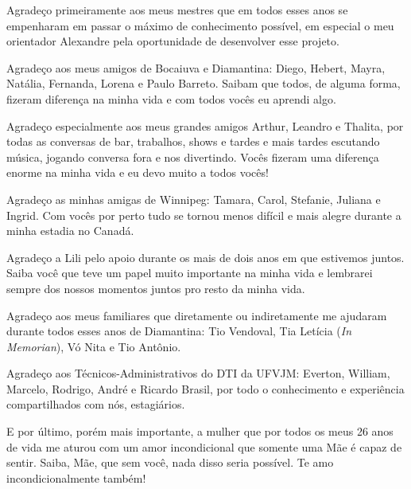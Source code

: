 \begin{agradecimentos}

Agradeço primeiramente aos meus mestres que em todos esses anos se empenharam 
em passar o máximo de conhecimento possível, em especial o meu orientador 
Alexandre pela oportunidade de desenvolver esse projeto.

Agradeço aos meus amigos de Bocaiuva e Diamantina: Diego, Hebert, Mayra, 
Natália, Fernanda, Lorena e Paulo Barreto. Saibam que todos, de alguma forma, 
fizeram diferença na minha vida e com todos vocês eu aprendi algo.

Agradeço especialmente aos meus grandes amigos Arthur, Leandro e Thalita, por 
todas as conversas de bar, trabalhos, shows e tardes e mais tardes escutando 
música, jogando conversa fora e nos divertindo. Vocês fizeram uma diferença 
enorme na minha vida e eu devo muito a todos vocês!

Agradeço as minhas amigas de Winnipeg: Tamara, Carol, Stefanie, Juliana e 
Ingrid. Com vocês por perto tudo se tornou menos difícil e mais alegre durante 
a minha estadia no Canadá.

Agradeço a Lili pelo apoio durante os mais de dois anos em que estivemos 
juntos. Saiba você que teve um papel muito importante na minha vida e lembrarei 
sempre dos nossos momentos juntos pro resto da minha vida.

Agradeço aos meus familiares que diretamente ou indiretamente me ajudaram 
durante todos esses anos de Diamantina: Tio Vendoval, Tia Letícia (\textit{In 
Memorian}), Vó Nita e Tio Antônio.

Agradeço aos Técnicos-Administrativos do DTI da UFVJM: Everton, William, 
Marcelo, Rodrigo, André e Ricardo Brasil, por todo o conhecimento e experiência 
compartilhados com nós, estagiários.

E por último, porém mais importante, a mulher que por todos os meus 26 anos de 
vida me aturou com um amor incondicional que somente uma Mãe é capaz de sentir. 
Saiba, Mãe, que sem você, nada disso seria possível. Te amo incondicionalmente 
também!

\end{agradecimentos}